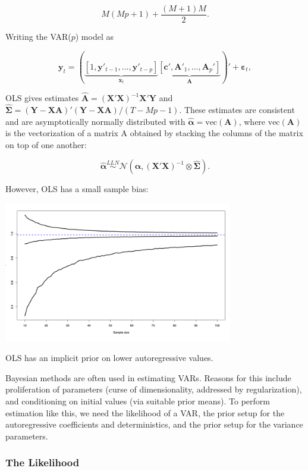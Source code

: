 \[
	M(Mp+1)+\frac{(M+1)M}{2}.
\]

Writing the VAR($p$) model as

\[
	\bm{y}_t = (\underbrace{[1,\bm{y}'_{t-1},\dots,\bm{y}'_{t-p}]}_{\bm{x}_t}\underbrace{[\bm{c}',\bm{A}'_1,\dots,\bm{A}_p']}_{\bm{A}})'+\bm{\varepsilon}_t,
\]

OLS gives estimates $\hat{\bm{A}} = (\bm{X}'\bm{X})^{-1}\bm{X}'\bm{Y}$ and $\hat{\bm{\Sigma}} = (\bm{Y}-\bm{XA})'(\bm{Y}-\bm{XA})/(T-Mp-1)$. These estimates are consistent and are asymptotically normally distributed with $\hat{\bm{\alpha}} = \mathrm{vec}(\bm{A})$, where $\mathrm{vec}(\bm{A})$ is the vectorization of a matrix A obtained by stacking the columns of the matrix on top of one another:

\[
	\hat{\bm{\alpha}}\overset{LLN}{\sim}\mathcal{N}(\bm{\alpha},(\bm{X}'\bm{X})^{-1}\otimes \hat{\bm{\Sigma}}).
\]

However, OLS has a small sample bias:

\begin{center}
	\includegraphics[width = 10cm]{smallsamplebias.png}
\end{center}

OLS has an implicit prior on lower autoregressive values. 

Bayesian methods are often used in estimating VARs. Reasons for this include proliferation of parameters (curse of dimensionality, addressed by regularization), and conditioning on initial values (via suitable prior means). To perform estimation like this, we need the likelihood of a VAR, the prior setup for the autoregressive coefficients and deterministics, and the prior setup for the variance parameters. 

\subsubsection{The Likelihood}

